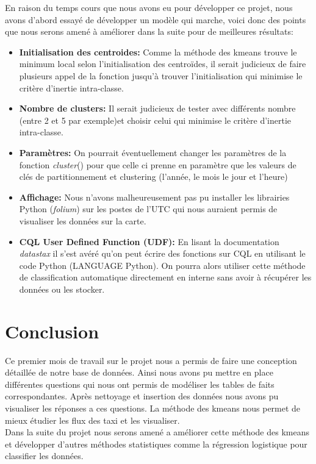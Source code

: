 \documentclass[]{report}
\begin{document}
	En raison du temps cours que  nous avons eu pour développer ce projet, nous avons d'abord essayé de développer un modèle qui marche, voici donc des points que nous  serons amené à  améliorer dans la suite pour de meilleures résultats:
	\begin{itemize}
		\item \textbf{Initialisation des centroides:} Comme la méthode des kmeans trouve le minimum local selon l'initialisation des centroïdes, il serait judicieux de faire plusieurs appel de la fonction jusqu'à trouver l'initialisation qui minimise le critère d'inertie intra-classe.
		\item \textbf{Nombre de clusters:}  Il serait judicieux de tester avec différents nombre (entre 2 et 5 par exemple)et choisir celui qui minimise le critère d'inertie intra-classe.
		\item \textbf{Paramètres:} On pourrait éventuellement changer les paramètres de la fonction \textit{cluster}() pour que celle ci prenne en paramètre que les valeurs de clés de partitionnement  et clustering (l'année, le mois le jour et l'heure)
		\item \textbf{Affichage:} Nous n'avons malheureusement pas pu installer les librairies Python (\textit{folium}) sur les postes de l'UTC qui nous auraient permis de visualiser les données sur la carte.
		\item \textbf{CQL User Defined Function (UDF):} En lisant la documentation \textit{datastax} il s'est avéré qu'on peut écrire des fonctions sur CQL en utilisant le code Python (LANGUAGE Python). On pourra alors utiliser cette méthode de classification automatique directement en interne sans avoir à récupérer les données ou les stocker.
	\end{itemize}
	
	\section{Conclusion}
	Ce premier mois de travail sur le projet nous a permis de faire une conception détaillée de notre base de données. Ainsi nous avons pu mettre en place différentes questions qui nous ont permis de modéliser les tables de faits correspondantes. Après nettoyage et insertion des données nous avons pu visualiser les réponses a ces questions. La méthode des kmeans nous permet de mieux étudier les flux des taxi et les visualiser.\\
	Dans la suite du projet nous serons amené a améliorer cette méthode des kmeans et développer d'autres méthodes statistiques comme la régression logistique pour classifier les données.
	
\end{document}
